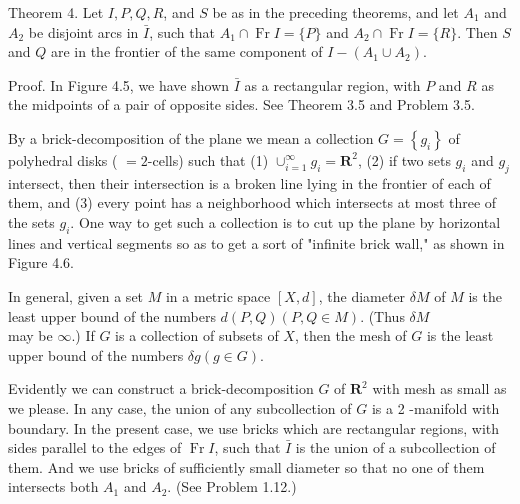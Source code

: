 Theorem 4. Let $I, P, Q, R$, and $S$ be as in the preceding theorems, and let $A_{1}$ and $A_{2}$ be disjoint arcs in $\bar{I}$, such that $A_{1} \cap \operatorname{Fr} I=\{P\}$ and $A_{2} \cap \operatorname{Fr} I= \{R\}$. Then $S$ and $Q$ are in the frontier of the same component of $I-\left(A_{1} \cup A_{2}\right)$.

\begin{center}
\end{center}


Proof. In Figure 4.5, we have shown $\bar{I}$ as a rectangular region, with $P$ and $R$ as the midpoints of a pair of opposite sides. See Theorem 3.5 and Problem 3.5.

By a brick-decomposition of the plane we mean a collection $G=\left\{g_{i}\right\}$ of polyhedral disks ( $=2$-cells) such that (1) $\cup_{i=1}^{\infty} g_{i}=\mathbf{R}^{2}$, (2) if two sets $g_{i}$ and $g_{j}$ intersect, then their intersection is a broken line lying in the frontier of each of them, and (3) every point has a neighborhood which intersects at most three of the sets $g_{i}$. One way to get such a collection is to cut up the plane by horizontal lines and vertical segments so as to get a sort of "infinite brick wall," as shown in Figure 4.6.

\begin{center}
\end{center}


In general, given a set $M$ in a metric space $[X, d]$, the diameter $\delta M$ of $M$ is the least upper bound of the numbers $d(P, Q)(P, Q \in M)$. (Thus $\delta M$\\
may be $\infty$.) If $G$ is a collection of subsets of $X$, then the mesh of $G$ is the least upper bound of the numbers $\delta g(g \in G)$.

Evidently we can construct a brick-decomposition $G$ of $\mathbf{R}^{2}$ with mesh as small as we please. In any case, the union of any subcollection of $G$ is a 2 -manifold with boundary. In the present case, we use bricks which are rectangular regions, with sides parallel to the edges of $\operatorname{Fr} I$, such that $\bar{I}$ is the union of a subcollection of them. And we use bricks of sufficiently small diameter so that no one of them intersects both $A_{1}$ and $A_{2}$. (See Problem 1.12.)

